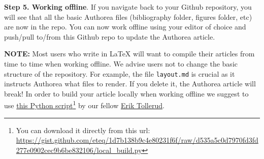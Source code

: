 \textbf{Step 5. Working offline}. If you navigate back to your Github repository, you will see that all the basic Authorea files (bibliography folder, figures folder, etc) are now in the repo. You can now work offline using your editor of choice and push/pull to/from this Github repo to update the Authorea article. 

\textbf{NOTE:} Most users who write in LaTeX will want to compile their articles from time to time when working offline. We advise users not to change the basic structure of the repository. For example, the file \verb|layout.md| is crucial as it instructs Authorea what files to render. If you delete it, the Authorea article will break! In order to build your article locally when working offline we suggest to use \href{https://gist.github.com/eteq/1d7b138b9c4e80231f6f}{this Python script}\footnote{You can download it directly from this url: \\ \url{https://gist.github.com/eteq/1d7b138b9c4e80231f6f/raw/d535a5c0d7970fd3fd277e0902cec9b6be832106/local_build.py}} by our fellow \href{https://gist.github.com/eteq}{Erik Tollerud}. 